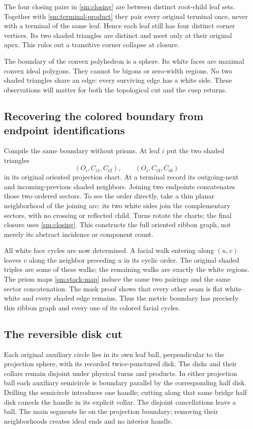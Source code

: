 The four closing pairs in \eqref{sm:closing} are between distinct
root-child leaf sets. Together with \eqref{sm:terminal-product}
they pair every original terminal once, never with a terminal of
the same leaf. Hence each leaf still has four distinct corner
vertices. Its two shaded triangles are distinct and meet only
at their original apex. This rules out a transitive corner
collapse at closure.

The boundary of the convex polyhedron is a sphere. Its
white faces are maximal convex ideal polygons. They cannot be
bigons or zero-width regions. No two shaded triangles share an
edge: every surviving edge has a white side. These observations
will matter for both the topological cut and the cusp returns.

\subsection{Recovering the colored boundary from endpoint identifications}
Compile the same boundary without prisms. At leaf $i$ put the
two shaded triangles
\[
       (O_i,C_{i1},C_{i2}),\qquad (O_i,C_{i3},C_{i0})
\]
in its original oriented projection chart. At a terminal record
its outgoing-next and incoming-previous shaded neighbors. Joining
two endpoints concatenates those two ordered
sectors. To see the order directly, take a thin planar neighborhood
of the joining arc: its two white sides join the complementary
sectors, with no crossing or reflected child.
Turns rotate the charts; the final closure uses
\eqref{sm:closing}. This constructs the full oriented ribbon graph,
not merely its abstract incidence or component count.

All white face cycles are now determined. A facial walk entering
along $(u,v)$ leaves $v$ along the neighbor preceding $u$ in its
cyclic order. The original shaded triples are some of these walks;
the remaining walks are exactly the white regions.
The prism maps \eqref{sm:stack-map} induce the same two pairings
and the same sector concatenation. The mask proof shows that
every other seam is flat white--white and every shaded edge remains.
Thus the metric boundary has precisely this ribbon graph and
every one of its colored facial cycles.

\subsection{The reversible disk cut}
Each original auxiliary circle lies in its own leaf ball, perpendicular
to the projection sphere, with its recorded twice-punctured disk.
The disks and their collars remain disjoint under physical turns
and products. In either projection ball each auxiliary semicircle
is boundary parallel by the corresponding half disk.
Drilling the semicircle introduces one handle; cutting along that
same bridge half disk cancels the handle in its explicit collar.
The disjoint cancellations leave a ball. The main segments lie
on the projection boundary; removing their neighborhoods creates
ideal ends and no interior handle.

